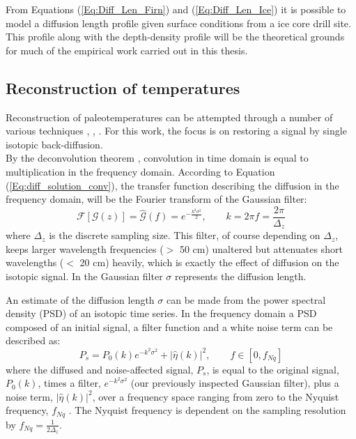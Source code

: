 \documentclass[../../CompleteThesis2/Complete_2ndDraft]{subfiles}
\begin{document}
From Equations (\ref{Eq:Diff_Len_Firn}) and (\ref{Eq:Diff_Len_Ice}) it is possible to model a diffusion length profile given surface conditions from a ice core drill site. This profile along with the depth-density profile will be the theoretical grounds for much of the empirical work carried out in this thesis.

\subsection{Reconstruction of temperatures}
\label{Subsec:Ice_DiffusionAndDensification_Diffusion_TemperatureRecon}
Reconstruction of paleotemperatures can be attempted through a number of various techniques \cite{Jouzel1997}, \cite{Holme2018}, \cite{Gkinis2014}. For this work, the focus is on restoring a signal by single isotopic back-diffusion.\\
By the deconvolution theorem \cite{McGillem1984}, convolution in time domain is equal to multiplication in the frequency domain. According to Equation (\ref{Eq:diff_solution_conv}), the transfer function describing the diffusion in the frequency domain, will be the Fourier transform of the Gaussian filter:
\begin{equation}
	\mathcal{F}[\mathcal{G}(z)] = \hat{\mathcal{G}}(f) = e^{-\frac{k^2\sigma^2}{2}}, \qquad k = 2\pi f = \frac{2\pi}{\Delta_z}
	\label{Eq:Transer_Fct}
\end{equation} 
where $\Delta_z$ is the discrete sampling size. This filter, of course depending on $\Delta_z$, keeps larger wavelength frequencies ($>$ 50 cm) unaltered but attenuates short wavelengths ($<$ 20 cm) heavily, which is exactly the effect of diffusion on the isotopic signal. In the Gaussian filter $\sigma$ represents the diffusion length.

An estimate of the diffusion length $\sigma$ can be made from the power spectral density (PSD) of an isotopic time series. In the frequency domain a PSD composed of an initial signal, a filter function and a white noise term can be described as:
\begin{equation}
	P_s = P_0(k) e^{-k^2\sigma^2} + |\hat{\eta}(k)|^2, \qquad f \in [0, f_{Nq}]
	\label{Eq:PSD_general}
\end{equation} 
where the diffused and noise-affected signal, $P_s$, is equal to the original signal, $P_0(k)$, times a filter, $e^{-k^2\sigma^2}$ (our previously inspected Gaussian filter), plus a noise term, $|\hat{\eta}(k)|^2$, over a frequency space ranging from zero to the Nyquist frequency, $f_{Nq}$ \cite[C. Shannon, 1949]{Shannon1949}. The Nyquist frequency is dependent on the sampling resolution by $f_{Nq} = \frac{1}{2\Delta_z}$.
\end{document}
